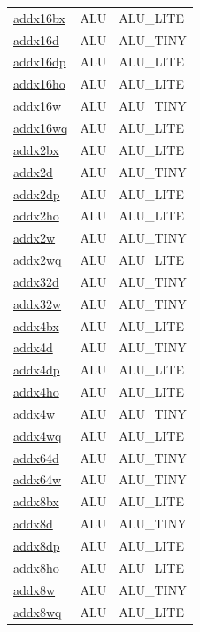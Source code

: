 \begin{small}
\begin{longtable}[l]{l l l}
\hyperlink{lvx.addx16bx}{addx16bx} & ALU & ALU\_LITE \\ 
\hyperlink{lvx.addx16d}{addx16d} & ALU & ALU\_TINY \\ 
\hyperlink{lvx.addx16dp}{addx16dp} & ALU & ALU\_LITE \\ 
\hyperlink{lvx.addx16ho}{addx16ho} & ALU & ALU\_LITE \\ 
\hyperlink{lvx.addx16w}{addx16w} & ALU & ALU\_TINY \\ 
\hyperlink{lvx.addx16wq}{addx16wq} & ALU & ALU\_LITE \\ 
\hyperlink{lvx.addx2bx}{addx2bx} & ALU & ALU\_LITE \\ 
\hyperlink{lvx.addx2d}{addx2d} & ALU & ALU\_TINY \\ 
\hyperlink{lvx.addx2dp}{addx2dp} & ALU & ALU\_LITE \\ 
\hyperlink{lvx.addx2ho}{addx2ho} & ALU & ALU\_LITE \\ 
\hyperlink{lvx.addx2w}{addx2w} & ALU & ALU\_TINY \\ 
\hyperlink{lvx.addx2wq}{addx2wq} & ALU & ALU\_LITE \\ 
\hyperlink{lvx.addx32d}{addx32d} & ALU & ALU\_TINY \\ 
\hyperlink{lvx.addx32w}{addx32w} & ALU & ALU\_TINY \\ 
\hyperlink{lvx.addx4bx}{addx4bx} & ALU & ALU\_LITE \\ 
\hyperlink{lvx.addx4d}{addx4d} & ALU & ALU\_TINY \\ 
\hyperlink{lvx.addx4dp}{addx4dp} & ALU & ALU\_LITE \\ 
\hyperlink{lvx.addx4ho}{addx4ho} & ALU & ALU\_LITE \\ 
\hyperlink{lvx.addx4w}{addx4w} & ALU & ALU\_TINY \\ 
\hyperlink{lvx.addx4wq}{addx4wq} & ALU & ALU\_LITE \\ 
\hyperlink{lvx.addx64d}{addx64d} & ALU & ALU\_TINY \\ 
\hyperlink{lvx.addx64w}{addx64w} & ALU & ALU\_TINY \\ 
\hyperlink{lvx.addx8bx}{addx8bx} & ALU & ALU\_LITE \\ 
\hyperlink{lvx.addx8d}{addx8d} & ALU & ALU\_TINY \\ 
\hyperlink{lvx.addx8dp}{addx8dp} & ALU & ALU\_LITE \\ 
\hyperlink{lvx.addx8ho}{addx8ho} & ALU & ALU\_LITE \\ 
\hyperlink{lvx.addx8w}{addx8w} & ALU & ALU\_TINY \\ 
\hyperlink{lvx.addx8wq}{addx8wq} & ALU & ALU\_LITE \\ 

\end{longtable}
\end{small}
